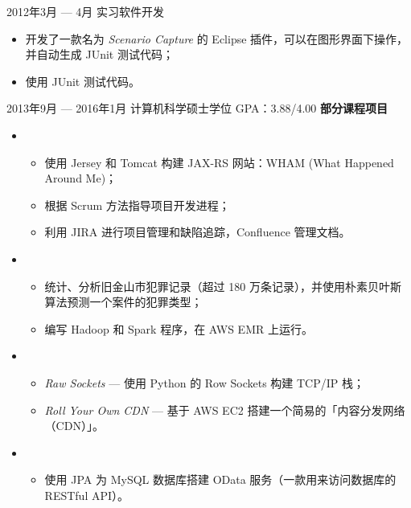 \documentclass{newresume}
\begin{document}
\begin{body}
	{2012年3月 --- 4月}
	{实习软件开发}{}
	\begin{itemize}[noitemsep,topsep=0pt]
		\item 开发了一款名为 \textit{Scenario Capture} 的 Eclipse 插件，可以在图形界面下操作，并自动生成 JUnit 测试代码；
		\item 使用 JUnit 测试代码。
	\end{itemize}
\end{body}
\smallskip


\begin{body}
	{2013年9月 --- 2016年1月}
	{计算机科学硕士学位}
	{GPA：3.88/4.00}
	\textbf{部分课程项目}
	\begin{itemize}
	\item {}
	\begin{itemize}
		\item 使用 Jersey 和 Tomcat 构建 JAX-RS 网站：WHAM (What Happened Around Me)；
		\item 根据 Scrum 方法指导项目开发进程；
		\item 利用 JIRA 进行项目管理和缺陷追踪，Confluence 管理文档。
	\end{itemize}

	\item {}
	\begin{itemize}
		\item 统计、分析旧金山市犯罪记录（超过 180 万条记录），并使用朴素贝叶斯算法预测一个案件的犯罪类型；
		\item 编写 Hadoop 和 Spark 程序，在 AWS EMR 上运行。
	\end{itemize}

	\item {}
	\begin{itemize}
		\item \textit{Raw Sockets} --- 使用 Python 的 Row Sockets 构建 TCP/IP 栈；
		\item \textit{Roll Your Own CDN} --- 基于 AWS EC2 搭建一个简易的「内容分发网络（CDN）」。
	\end{itemize}

	\item {}
	\begin{itemize}
		\item 使用 JPA 为 MySQL 数据库搭建 OData 服务（一款用来访问数据库的 RESTful API）。
	\end{itemize}


\end{itemize}
\end{body}
\end{document}
